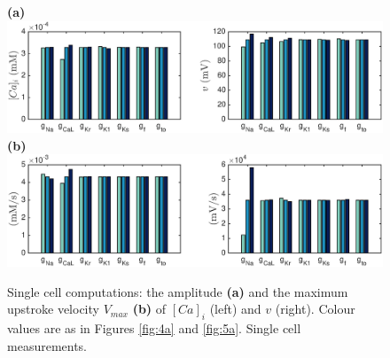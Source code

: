 \documentclass[12pt,a4paper]{article}
\begin{document}
\begin{figure}
 \textbf{(a)}  \includegraphics[trim=1cm 0cm 2cm 0cm, clip=true, width=1\linewidth]{sc_amplitude} 
 \textbf{(b)}  \includegraphics[trim=1cm 0cm 2cm 0cm, clip=true, width=1\linewidth]{sc_v_max} 
    \caption{Single cell computations: the amplitude \textbf{(a)} and the maximum upstroke velocity $V_{max}$ \textbf{(b)} of $[Ca]_i$ (left) and $v$ (right).  Colour values are as in Figures \ref{fig:4a} and \ref{fig:5a}. Single cell measurements.}
    \label{fig:6a}
\end{figure}
%
\end{document}
